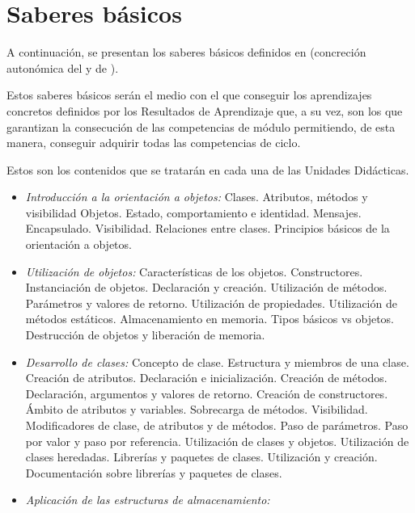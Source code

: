 \section{Saberes básicos}

A continuación, se presentan los  saberes básicos definidos en  (concreción autonómica del  y de ).

Estos saberes básicos serán el medio con el que conseguir los aprendizajes concretos definidos por los Resultados de Aprendizaje que, a su vez, son los que garantizan la consecución de las competencias de módulo permitiendo, de esta manera, conseguir adquirir todas las competencias de ciclo.

Estos son los contenidos que se tratarán en cada una de las Unidades Didácticas.

\begin{itemize}[itemsep=0.1em, topsep=0.1em]

\item\emph{Introducción a la orientación a objetos:}
Clases. Atributos, métodos y visibilidad
Objetos. Estado, comportamiento e identidad. Mensajes.
Encapsulado. Visibilidad.
Relaciones entre clases.
Principios básicos de la orientación a objetos.

\item\emph{Utilización de objetos:}
Características de los objetos.
Constructores.
Instanciación de objetos. Declaración y creación.
Utilización de métodos. Parámetros y valores de retorno.
Utilización de propiedades.
Utilización de métodos estáticos.
Almacenamiento en memoria. Tipos básicos vs objetos.
Destrucción de objetos y liberación de memoria.


\item\emph{Desarrollo de clases:}
Concepto de clase.
Estructura y miembros de una clase.
Creación de atributos. Declaración e inicialización.
Creación de métodos. Declaración, argumentos y valores de retorno.
Creación de constructores.
Ámbito de atributos y variables.
Sobrecarga de métodos.
Visibilidad. Modificadores de clase, de atributos y de métodos.
Paso de parámetros. Paso por valor y paso por referencia.
Utilización de clases y objetos.
Utilización de clases heredadas.
Librerías y paquetes de clases. Utilización y creación.
Documentación sobre librerías y paquetes de clases.

\item\emph{Aplicación de las estructuras de almacenamiento:}






\end{itemize}